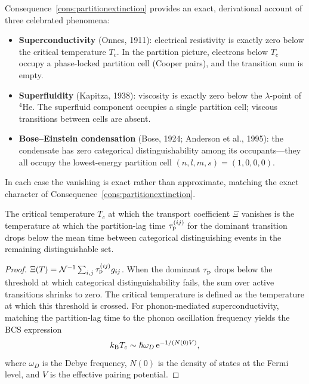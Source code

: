 \begin{remark}
Consequence~\ref{cons:partitionextinction} provides an exact, derivational
account of three celebrated phenomena:
\begin{itemize}[nosep]
  \item \textbf{Superconductivity} (Onnes, 1911): electrical resistivity
    is exactly zero below the critical temperature $T_c$.  In the
    partition picture, electrons below $T_c$ occupy a phase-locked
    partition cell (Cooper pairs), and the transition sum is empty.

  \item \textbf{Superfluidity} (Kapitza, 1938): viscosity is exactly zero
    below the $\lambda$-point of $^4$He.  The superfluid component
    occupies a single partition cell; viscous transitions between
    cells are absent.

  \item \textbf{Bose--Einstein condensation} (Bose, 1924; Anderson et
    al., 1995): the condensate has zero categorical distinguishability
    among its occupants---they all occupy the lowest-energy partition
    cell $(n,l,m,s) = (1,0,0,0)$.
\end{itemize}
In each case the vanishing is exact rather than approximate, matching the
exact character of Consequence~\ref{cons:partitionextinction}.
\end{remark}

\begin{corollary}
\label{cor:Tc}
The critical temperature $T_c$ at which the transport coefficient $\Xi$
vanishes is the temperature at which the partition-lag time
$\tau_{\mathrm{p}}^{(ij)}$ for the dominant transition drops below the mean time
between categorical distinguishing events in the remaining distinguishable
set.
\end{corollary}

\begin{proof}
$\Xi(T) = \mathcal{N}^{-1}\sum_{i,j}\tau_{\mathrm{p}}^{(ij)}g_{ij}$.
When the dominant $\tau_{\mathrm{p}}$ drops below the threshold at which categorical
distinguishability fails, the sum over active transitions shrinks to zero.
The critical temperature is defined as the temperature at which this
threshold is crossed.  For phonon-mediated superconductivity, matching the
partition-lag time to the phonon oscillation frequency yields the BCS
expression
\[
  k_{\mathrm{B}} T_c \sim \hslash\omega_D \,\mathrm{e}^{-1/(N(0)V)},
\]
where $\omega_D$ is the Debye frequency, $N(0)$ is the density of states
at the Fermi level, and $V$ is the effective pairing potential.
\end{proof}

